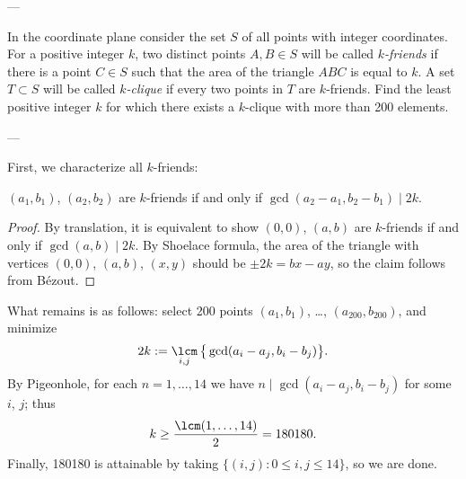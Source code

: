 
---

In the coordinate plane consider the set $S$ of all points with integer coordinates. For a positive integer $k$, two distinct points $A,B\in S$ will be called \emph{$k$-friends} if there is a point $C\in S$ such that the area of the triangle $ABC$ is equal to $k$. A set $T\subset S$ will be called \emph{$k$-clique} if every two points in $T$ are $k$-friends. Find the least positive integer $k$ for which there exists a $k$-clique with more than 200 elements.

---

First, we characterize all $k$-friends:
\begin{claim*}
    $(a_1,b_1)$, $(a_2,b_2)$ are $k$-friends if and only if $\gcd(a_2-a_1,b_2-b_1)\mid2k$.
\end{claim*}
\begin{proof}
    By translation, it is equivalent to show $(0,0)$, $(a,b)$ are $k$-friends if and only if $\gcd(a,b)\mid2k$. By Shoelace formula, the area of the triangle with vertices $(0,0)$, $(a,b)$, $(x,y)$ should be $\pm2k=bx-ay$, so the claim follows from B\'ezout.
\end{proof}

What remains is as follows: select 200 points $(a_1,b_1)$, \ldots, $(a_{200},b_{200})$, and minimize \[2k:=\mathop{\lcm}_{i,j}\big\{\gcd(a_i-a_j,b_i-b_j)\big\}.\]
By Pigeonhole, for each $n=1,\ldots,14$ we have $n\mid\gcd(a_i-a_j,b_i-b_j)$ for some $i$, $j$; thus \[k\ge\frac{\lcm(1,\ldots,14)}2=180180.\]
Finally, 180180 is attainable by taking $\{(i,j):0\le i,j\le14\}$, so we are done.

